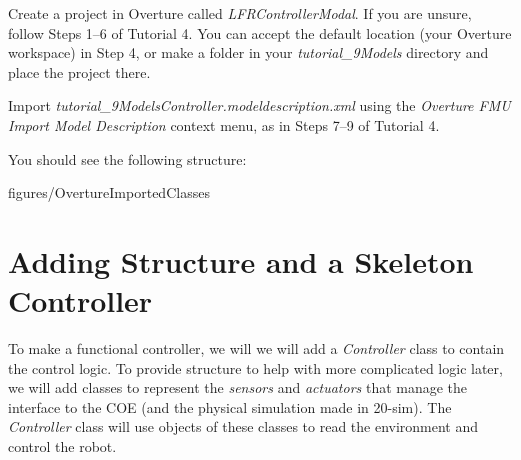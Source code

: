 \documentclass[11pt,a4paper]{../tutorial}
\begin{document}
\begin{instructions}
\item Create a project in Overture called \emph{LFRControllerModal}. If you are unsure, follow Steps 1--6 of Tutorial 4. You can accept the default location (your Overture workspace) in Step 4, or make a folder in your \emph{tutorial\_9\pathsep{}Models} directory and place the project there.

\item Import \emph{tutorial\_9\pathsep{}Models\pathsep{}Controller.modeldescription.xml} using the \emph{Overture FMU \menusep Import Model Description} context menu, as in Steps 7--9 of Tutorial 4.

    You should see the following structure:

    \begin{annotation}[width=0.25\linewidth,trim=0 300 535 0,clip]{figures/OvertureImportedClasses}
    \end{annotation}

\end{instructions}

\section{Adding Structure and a Skeleton Controller}

To make a functional controller, we will we will add a \emph{Controller} class to contain the control logic. To provide structure to help with more complicated logic later, we will add classes to represent the \emph{sensors} and \emph{actuators} that manage the interface to the COE (and the physical simulation made in 20-sim). The \emph{Controller} class will use objects of these classes to read the environment and control the robot.
\end{document}
